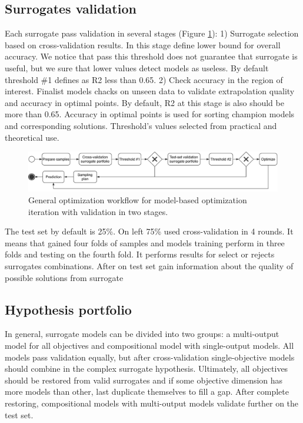     \subsection{Surrogates validation}
        Each surrogate pass validation in several stages (Figure \ref{fig:simsim_activity_validation}): 1) Surrogate selection based on cross-validation results. In this stage define lower bound for overall accuracy. We notice that pass this threshold does not guarantee that surrogate is useful, but we sure that lower values detect models as useless. By default threshold \#1 defines as R2 less than 0.65. 2) Check accuracy in the region of interest. Finalist models chacks on unseen data to validate extrapolation quality and accuracy in optimal points. By default, R2 at this stage is also should be more than 0.65. Accuracy in optimal points is used for sorting champion models and corresponding solutions. Threshold's values selected from practical and theoretical use.

            \begin{figure}
                \centering
                \includegraphics[width=\textwidth]{content/images/simsim_activity_workflow}
                \caption[General workflow activity]{General optimization workflow for model-based optimization iteration with validation in two stages.}
                \label{fig:simsim_activity_validation}
            \end{figure}

        The test set by default is 25\%. On left 75\% used cross-validation in 4 rounds. It means that gained four folds of samples and models training perform in three folds and testing on the fourth fold. It performs results for select or rejects surrogates combinations. After on test set gain information about the quality of possible solutions from surrogate 


    \subsection{Hypothesis portfolio}
    In general, surrogate models can be divided into two groups: a multi-output model for all objectives and compositional model with single-output models. All models pass validation equally, but after cross-validation single-objective models should combine in the complex surrogate hypothesis. 
    Ultimately, all objectives should be restored from valid surrogates and if some objective dimension has more models than other, last duplicate themselves to fill a gap. After complete restoring, compositional models with multi-output models validate further on the test set.

